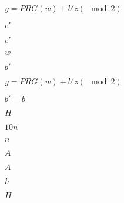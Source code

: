 \documentclass[10pt]{book}
\begin{document}
\begin{mdSnippets}
\begin{mdInlineSnippet}
$y=PRG(w)+ b'z (\mod 2)$\end{mdInlineSnippet}%
\begin{mdInlineSnippet}[12c7acffa10294560a339fa9f4796b80]%
$c'$\end{mdInlineSnippet}%
\begin{mdInlineSnippet}[12c7acffa10294560a339fa9f4796b80]%
$c'$\end{mdInlineSnippet}%
\begin{mdInlineSnippet}[f1290186a5d0b1ceab27f4e77c0c5d68]%
$w$\end{mdInlineSnippet}%
\begin{mdInlineSnippet}[2765802181072b3aa2be59dae8c72b0d]%
$b'$\end{mdInlineSnippet}%
\begin{mdInlineSnippet}[0261ce2d6c22898896c72466c29d6355]%
$y=PRG(w)+b'z (\mod 2)$\end{mdInlineSnippet}%
\begin{mdInlineSnippet}%
$b'=b$\end{mdInlineSnippet}%
\begin{mdInlineSnippet}[c1d9f50f86825a1a2302ec2449c17196]%
$H$\end{mdInlineSnippet}%
\begin{mdInlineSnippet}[cf326524548b2cf10050459e96fc97ad]%
$10n$\end{mdInlineSnippet}%
\begin{mdInlineSnippet}[7b8b965ad4bca0e41ab51de7b31363a1]%
$n$\end{mdInlineSnippet}%
\begin{mdInlineSnippet}[7fc56270e7a70fa81a5935b72eacbe29]%
$A$\end{mdInlineSnippet}%
\begin{mdInlineSnippet}[7fc56270e7a70fa81a5935b72eacbe29]%
$A$\end{mdInlineSnippet}%
\begin{mdInlineSnippet}[2510c39011c5be704182423e3a695e91]%
$h$\end{mdInlineSnippet}%
\begin{mdInlineSnippet}[c1d9f50f86825a1a2302ec2449c17196]%
$H$\end{mdInlineSnippet}%

\end{mdSnippets}
\end{document}
